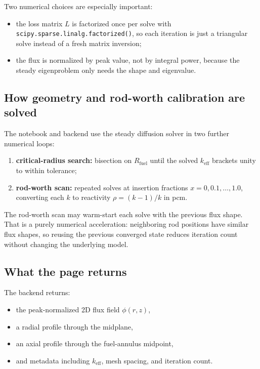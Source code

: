 \documentclass[11pt]{article}
\begin{document}
Two numerical choices are especially important:
\begin{itemize}
  \item the loss matrix $L$ is factorized once per solve with
        \texttt{scipy.sparse.linalg.factorized()}, so each iteration is just a
        triangular solve instead of a fresh matrix inversion;
  \item the flux is normalized by peak value, not by integral power, because the
        steady eigenproblem only needs the shape and eigenvalue.
\end{itemize}

\subsection{How geometry and rod-worth calibration are solved}

The notebook and backend use the steady diffusion solver in two further numerical
loops:
\begin{enumerate}
  \item \textbf{critical-radius search:} bisection on $R_{\mathrm{fuel}}$ until
        the solved $k_{\mathrm{eff}}$ brackets unity to within tolerance;
  \item \textbf{rod-worth scan:} repeated solves at insertion fractions
        $x=0,0.1,\dots,1.0$, converting each $k$ to reactivity
        $\rho = (k-1)/k$ in pcm.
\end{enumerate}

The rod-worth scan may warm-start each solve with the previous flux shape.  That
is a purely numerical acceleration: neighboring rod positions have similar flux
shapes, so reusing the previous converged state reduces iteration count without
changing the underlying model.

\subsection{What the page returns}

The backend returns:
\begin{itemize}
  \item the peak-normalized 2D flux field $\phi(r,z)$,
  \item a radial profile through the midplane,
  \item an axial profile through the fuel-annulus midpoint,
  \item and metadata including $k_{\mathrm{eff}}$, mesh spacing, and iteration count.
\end{itemize}
\end{document}
